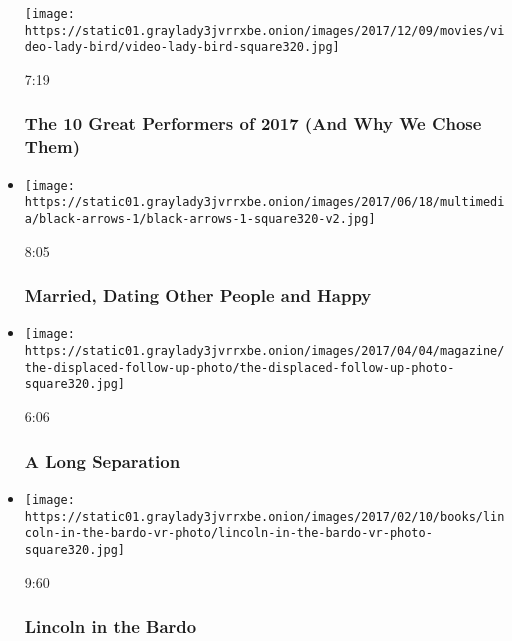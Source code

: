 \begin{itemize}
  \texttt{[image: https://static01.graylady3jvrrxbe.onion/images/2017/12/09/movies/video-lady-bird/video-lady-bird-square320.jpg]}

  7:19

  \hypertarget{the-10-great-performers-of-2017-and-why-we-chose-them}{%
  \subsubsection{The 10 Great Performers of 2017 (And Why We Chose
  Them)}\label{the-10-great-performers-of-2017-and-why-we-chose-them}}
\item
  \href{https://www.nytimes3xbfgragh.onion/video/magazine/100000005087630/open-marriages-non-monogamy.html?action=click\&module=video-series-bar\&region=header\&pgtype=Article\&playlistId=video/magazine}{}

  \texttt{[image: https://static01.graylady3jvrrxbe.onion/images/2017/06/18/multimedia/black-arrows-1/black-arrows-1-square320-v2.jpg]}

  8:05

  \hypertarget{married-dating-other-people-and-happy}{%
  \subsubsection{Married, Dating Other People and
  Happy}\label{married-dating-other-people-and-happy}}
\item
  \href{https://www.nytimes3xbfgragh.onion/video/magazine/100000005013826/lynsey-addario-south-sudan-refugee.html?action=click\&module=video-series-bar\&region=header\&pgtype=Article\&playlistId=video/magazine}{}

  \texttt{[image: https://static01.graylady3jvrrxbe.onion/images/2017/04/04/magazine/the-displaced-follow-up-photo/the-displaced-follow-up-photo-square320.jpg]}

  6:06

  \hypertarget{a-long-separation}{%
  \subsubsection{A Long Separation}\label{a-long-separation}}
\item
  \href{https://www.nytimes3xbfgragh.onion/video/magazine/100000004919906/lincoln-in-the-bardo.html?action=click\&module=video-series-bar\&region=header\&pgtype=Article\&playlistId=video/magazine}{}

  \texttt{[image: https://static01.graylady3jvrrxbe.onion/images/2017/02/10/books/lincoln-in-the-bardo-vr-photo/lincoln-in-the-bardo-vr-photo-square320.jpg]}

  9:60

  \hypertarget{lincoln-in-the-bardo}{%
  \subsubsection{Lincoln in the Bardo}\label{lincoln-in-the-bardo}}
\end{itemize}

